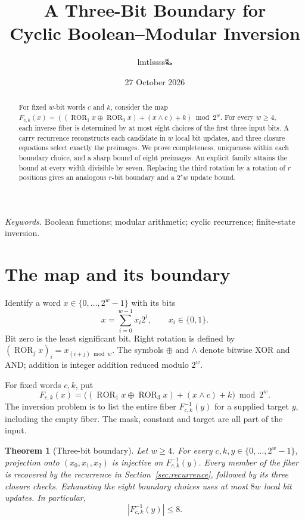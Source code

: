 \documentclass[11pt,a4paper]{article}
\title{\LARGE A Three-Bit Boundary for\\Cyclic Boolean--Modular Inversion}
\author{lmtlssss{\authorsymbol 🜐}}
\date{27 October 2026}
\newtheorem{theorem}{Theorem}
\newcommand{\B}{\{0,1\}}
\newcommand{\xor}{\mathbin{\oplus}}
\DeclareMathOperator{\ROR}{ROR}
\begin{document}
\maketitle\thispagestyle{plain}
\begin{abstract}
For fixed $w$-bit words $c$ and $k$, consider the map
$F_{c,k}(x)=((\ROR_1x\xor\ROR_3x)+(x\land c)+k)\bmod 2^w$.
For every $w\ge4$, each inverse fiber is determined by at most eight choices of the first three input bits. A carry recurrence reconstructs each candidate in $w$ local bit updates, and three closure equations select exactly the preimages. We prove completeness, uniqueness within each boundary choice, and a sharp bound of eight preimages. An explicit family attains the bound at every width divisible by seven. Replacing the third rotation by a rotation of $r$ positions gives an analogous $r$-bit boundary and a $2^r w$ update bound.
\end{abstract}
\noindent\textit{Keywords.} Boolean functions; modular arithmetic; cyclic recurrence; finite-state inversion.

\section{The map and its boundary}
Identify a word $x\in\{0,\ldots,2^w-1\}$ with its bits
\[
 x=\sum_{i=0}^{w-1}x_i2^i,\qquad x_i\in\B.
\]
Bit zero is the least significant bit. Right rotation is defined by
$(\ROR_jx)_i=x_{(i+j)\bmod w}$. The symbols $\xor$ and $\land$ denote bitwise XOR and AND; addition is integer addition reduced modulo $2^w$.

For fixed words $c,k$, put
\begin{equation}\label{eq:map}
 F_{c,k}(x)=\bigl((\ROR_1x\xor\ROR_3x)+(x\land c)+k\bigr)\bmod 2^w.
\end{equation}
The inversion problem is to list the entire fiber $F_{c,k}^{-1}(y)$ for a supplied target $y$, including the empty fiber. The mask, constant and target are all part of the input.

\begin{theorem}[Three-bit boundary]\label{thm:main}
Let $w\ge4$. For every $c,k,y\in\{0,\ldots,2^w-1\}$, projection onto $(x_0,x_1,x_2)$ is injective on $F_{c,k}^{-1}(y)$. Every member of the fiber is recovered by the recurrence in Section~\ref{sec:recurrence}, followed by its three closure checks. Exhausting the eight boundary choices uses at most $8w$ local bit updates. In particular,
\begin{equation}\label{eq:bound}
 |F_{c,k}^{-1}(y)|\le8.
\end{equation}
\end{theorem}
\end{document}
